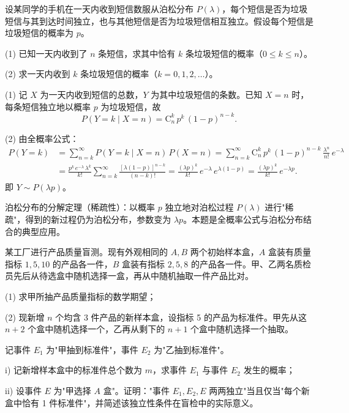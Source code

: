 ﻿\documentclass[lang=cn,11pt]{elegantbook}
\begin{document}
\begin{exercise}[提高]\label{exer:1-55}
设某同学的手机在一天内收到短信数服从泊松分布 \(P(\lambda)\)，每个短信是否为垃圾短信与其到达时间独立，也与其他短信是否为垃圾短信相互独立。假设每个短信是垃圾短信的概率为 \(p\)。\par
(1) 已知一天内收到了 \(n\) 条短信，求其中恰有 \(k\) 条垃圾短信的概率（\(0\le k\le n\)）。\par
(2) 求一天内收到 \(k\) 条垃圾短信的概率（\(k=0,1,2,\dots\)）。
\end{exercise}

\begin{solution}
(1) 记 \(X\) 为一天内收到短信的总数，\(Y\) 为其中垃圾短信的条数。已知 \(X=n\) 时，每条短信独立地以概率 \(p\) 为垃圾短信，故
\[
P(Y=k\mid X=n) = \mathrm{C}_n^k\,p^k\,(1-p)^{n-k}.
\]

(2) 由全概率公式：
\begin{align*}
P(Y=k) &= \sum_{n=k}^{\infty} P(Y=k\mid X=n)\,P(X=n) = \sum_{n=k}^{\infty} \mathrm{C}_n^k\,p^k\,(1-p)^{n-k}\,\frac{\lambda^n}{n!}\,e^{-\lambda} \\
&= \frac{p^k\,e^{-\lambda}\,\lambda^k}{k!}\sum_{n=k}^{\infty}\frac{[\lambda(1-p)]^{n-k}}{(n-k)!} = \frac{(\lambda p)^k}{k!}\,e^{-\lambda}\,e^{\lambda(1-p)} = \frac{(\lambda p)^k}{k!}\,e^{-\lambda p}.
\end{align*}
即 \(Y\sim P(\lambda p)\)。
\end{solution}

\begin{note}
泊松分布的分解定理（稀疏性）：以概率 \(p\) 独立地对泊松过程 \(P(\lambda)\) 进行"稀疏"，得到的新过程仍为泊松分布，参数变为 \(\lambda p\)。本题是全概率公式与泊松分布结合的典型应用。
\end{note}


\begin{exercise}[提高]
某工厂进行产品质量盲测。现有外观相同的 \(A,B\) 两个初始样本盒，\(A\) 盒装有质量指标 \(1,5,10\) 的产品各一件，\(B\) 盒装有指标 \(2,5,8\) 的产品各一件。甲、乙两名质检员先后从待选盒中随机选择一盒，再从中随机抽取一件产品比对。\par
(1) 求甲所抽产品质量指标的数学期望；\par
(2) 现新增 \(n\) 个均含 3 件产品的新样本盒，设指标 5 的产品为标准件。甲先从这 \(n+2\) 个盒中随机选择一个，乙再从剩下的 \(n+1\) 个盒中随机选择一个抽取。\par
记事件 \(E_1\) 为"甲抽到标准件"，事件 \(E_2\) 为"乙抽到标准件"。\par
i) 记新增样本盒中的标准件总个数为 \(m\)，求事件 \(E_1\) 与事件 \(E_2\) 发生的概率；\par
ii) 设事件 \(E\) 为"甲选择 \(A\) 盒"。证明："事件 \(E_1,E_2,E\) 两两独立"当且仅当"每个新盒中恰有 1 件标准件"，并简述该独立性条件在盲检中的实际意义。
\end{exercise}
\end{document}
